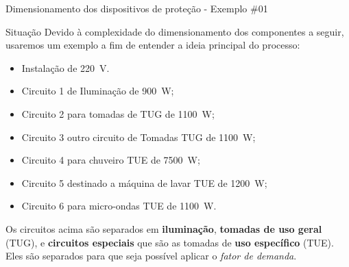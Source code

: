 \begin{frame}{Dimensionamento dos dispositivos de proteção - Exemplo \#01}
	\begin{block}{Situação}
		Devido à complexidade do dimensionamento dos componentes a seguir, usaremos um exemplo a fim de entender a ideia principal do processo:
		\begin{itemize}
			\item Instalação de \SI{220}{\volt}.
			\item Circuito 1 de Iluminação de \SI{900}{\watt};
			\item Circuito 2 para tomadas de TUG de \SI{1100}{\watt};
			\item Circuito 3 outro circuito de Tomadas TUG de \SI{1100}{\watt};
			\item Circuito 4 para chuveiro TUE de \SI{7500}{\watt};
			\item Circuito 5 destinado a máquina de lavar TUE de \SI{1200}{\watt};
			\item Circuito 6 para micro-ondas TUE de \SI{1100}{\watt}.
		\end{itemize}
		Os circuitos acima são separados em \textbf{iluminação}, \textbf{tomadas de uso geral} (TUG), e \textbf{circuitos especiais} que são as tomadas de \textbf{uso específico} (TUE). Eles são separados para que seja possível aplicar o \textit{fator de demanda}.
	\end{block}
\end{frame}



